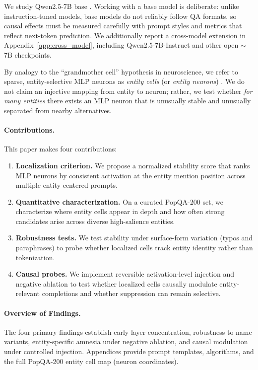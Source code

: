 \documentclass[10pt,twocolumn]{article}
\begin{document}
We study Qwen2.5-7B base \cite{qwen25}. Working with a base model is deliberate: unlike instruction-tuned models, base models do not reliably follow QA formats, so causal effects must be measured carefully with prompt styles and metrics that reflect next-token prediction. We additionally report a cross-model extension in Appendix~\ref{app:cross_model}, including Qwen2.5-7B-Instruct and other open $\sim$7B checkpoints.

By analogy to the ``grandmother cell'' hypothesis in neuroscience, we refer to sparse, entity-selective MLP neurons as \emph{entity cells} (or \emph{entity neurons}) \cite{connor2005friends,quiroga2008sparse}. We do not claim an injective mapping from entity to neuron; rather, we test whether \emph{for many entities} there exists an MLP neuron that is unusually stable and unusually separated from nearby alternatives.

\paragraph{Contributions.} This paper makes four contributions:
\begin{enumerate}
  \item \textbf{Localization criterion.} We propose a normalized stability score that ranks MLP neurons by consistent activation at the entity mention position across multiple entity-centered prompts.
  \item \textbf{Quantitative characterization.} On a curated PopQA-200 set, we characterize where entity cells appear in depth and how often strong candidates arise across diverse high-salience entities.
  \item \textbf{Robustness tests.} We test stability under surface-form variation (typos and paraphrases) to probe whether localized cells track entity identity rather than tokenization.
  \item \textbf{Causal probes.} We implement reversible activation-level injection and negative ablation to test whether localized cells causally modulate entity-relevant completions and whether suppression can remain selective.
\end{enumerate}

\paragraph{Overview of Findings.} The four primary findings establish early-layer concentration, robustness to name variants, entity-specific amnesia under negative ablation, and causal modulation under controlled injection. Appendices provide prompt templates, algorithms, and the full PopQA-200 entity cell map (neuron coordinates).
\end{document}
